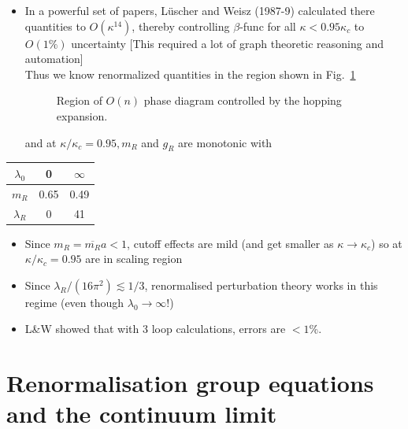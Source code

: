 \begin{itemize}
\begin{itemize}
  \item In a powerful set of papers, L\"uscher and  Weisz (1987-9) calculated there quantities to \(O\left(\kappa^{14}\right)\), thereby controlling \(\beta\)-func for all \(\kappa<0.95 \kappa_{c}\) to \(O(1\%)\) uncertainty [This required a lot of graph theoretic reasoning and automation]\\
Thus we know renormalized quantities in the region shown in Fig.~\ref{fig:hoppdiag2}
\begin{figure}
    \centering
    \caption{Region of $O(n)$ phase diagram controlled by the hopping expansion.
    \label{fig:hoppdiag2}}
\end{figure}
and at \(\kappa / \kappa_{c}=0.95, m_{R}\) and \(g_{R}\) are monotonic with
\end{itemize}

\begin{center}
\begin{tabular}{c|cc}
\(\lambda_0\) & 0 & \(\infty\) \\
\hline
\(m_{R}\) & 0.65 & 0.49 \\
\(\lambda_{R}\) & 0 & 41 \\
\end{tabular}
\end{center}

\begin{itemize}
  \item Since \(m_{R}=\overline{m_{R}} a<1\), cutoff effects are mild (and get smaller as $\kappa\to\kappa_c$) so at \(\kappa / \kappa_{c}=0.95\) are in scaling region
\item Since $\lambda_R/(16\pi^2)\lesssim 1/3$, renormalised perturbation theory works in this regime (even though $\lambda_0\to\infty$!)
\item L\&W showed that with 3 loop calculations, errors are $<1$\%.
\end{itemize}
\end{itemize}




\section{Renormalisation group equations and the continuum limit}

